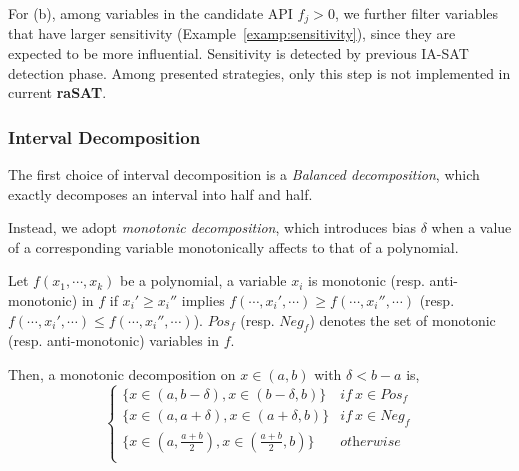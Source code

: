 \documentclass[runningheads,a4paper,oribibl]{llncs}
\newcommand{\suppress}[1]{} %
\newcommand{\smallHead}[1]{%
    \par\vspace{.35cm}\noindent\textbf{#1}%
    \par\noindent\ignorespaces%
}
\begin{document}
For (b), among variables in the candidate API $f_j > 0$, we further filter variables that 
have larger sensitivity (Example~\ref{examp:sensitivity}), since they are expected to be more 
influential. Sensitivity is detected by previous IA-SAT detection phase. 
Among presented strategies, only this step is not implemented in current {\bf raSAT}.

\medskip
\subsubsection{Interval Decomposition} \label{subsec:decomposition}

The first choice of interval decomposition is a {\em Balanced decomposition}, 
which exactly decomposes an interval into half and half. 
\suppress{
 decomposes an interval into two intervals exactly half. 

\begin{definition}
For an interval $x \in (a,b)$, a balanced decomposition is 
\[
D_b(x\in(a,b)) = \{x \in (a, \frac{a+b}{2}), x \in (\frac{a+b}{2}, b)\} 
\]
\end{definition} 
}
Instead, we adopt {\em monotonic decomposition}, which introduces bias $\delta$ 
when a value of a corresponding variable monotonically affects to that of a polynomial. 

\begin{definition} \label{def:mono}
Let $f(x_1, \cdots,x_k)$ be a polynomial, a variable $x_i$ is monotonic (resp. anti-monotonic) in $f$ 
if $x_i' \geq x_i''$ implies $f(\cdots,x_i',\cdots) \geq f(\cdots,x_i'',\cdots)$ 
(resp. $f(\cdots,x_i',\cdots) \leq f(\cdots,x_i'',\cdots)$).
$Pos_f$ (resp. $Neg_f$) denotes the set of monotonic (resp. anti-monotonic) variables in $f$. 

Then, a monotonic decomposition on $x \in (a,b)$ with $\delta < b-a$ is, 
\[
\begin{cases}
\{x\in (a,b-\delta), x \in (b-\delta,b)\} & \textit{if} ~x \in Pos_f\\
\{x\in (a,a+\delta), x \in (a+\delta,b)\} & \textit{if} ~x \in Neg_f\\
\{x \in (a, \frac{a+b}{2}), x \in (\frac{a+b}{2}, b)\} & \textit{otherwise}\\
\end {cases}
\]
\end{definition} 
\end{document}
